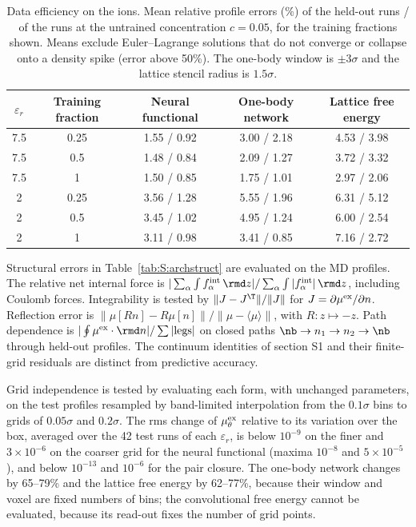\begin{table}[H]
\centering
\caption{Data efficiency on the ions. Mean relative profile errors (\%) of the held-out runs / of the runs at the untrained concentration $c=0.05$, for the training fractions shown. Means exclude Euler--Lagrange solutions that do not converge or collapse onto a density spike (error above 50\%). The one-body window is $\pm3\sigma$ and the lattice stencil radius is $1.5\sigma$.}
\label{tab:S:archfrac}
\begin{tabular}{c c c c c}
$\varepsilon_r$ & Training fraction & Neural functional & One-body network & Lattice free energy\\
\midrule
7.5 & 0.25 & 1.55 / 0.92 & 3.00 / 2.18 & 4.53 / 3.98\\
7.5 & 0.5 & 1.48 / 0.84 & 2.09 / 1.27 & 3.72 / 3.32\\
7.5 & 1 & 1.50 / 0.85 & 1.75 / 1.01 & 2.97 / 2.06\\
2 & 0.25 & 3.56 / 1.28 & 5.55 / 1.96 & 6.31 / 5.12\\
2 & 0.5 & 3.45 / 1.02 & 4.95 / 1.24 & 6.00 / 2.54\\
2 & 1 & 3.11 / 0.98 & 3.41 / 0.85 & 7.16 / 2.72\\
\bottomrule
\end{tabular}
\end{table}


Structural errors in Table~\ref{tab:S:archstruct} are evaluated on the MD profiles. The relative net internal force is $|\sum_\alpha\int f^{\rm int}_\alpha\,\rmd z|/\sum_\alpha\int|f^{\rm int}_\alpha|\,\rmd z$, including Coulomb forces. Integrability is tested by $\|J-J^{\T}\|/\|J\|$ for $J=\partial\mu^{\rm ex}/\partial n$. Reflection error is $\|\mu[Rn]-R\mu[n]\|/\|\mu-\langle\mu\rangle\|$, with $R:z\mapsto-z$. Path dependence is $|\oint\mu^{\rm ex}\cdot\rmd n|/\sum|{\rm legs}|$ on closed paths $\nb\to n_1\to n_2\to\nb$ through held-out profiles. The continuum identities of section S1 and their finite-grid residuals are distinct from predictive accuracy.

Grid independence is tested by evaluating each form, with unchanged parameters, on the test profiles resampled by band-limited interpolation from the $0.1\sigma$ bins to grids of $0.05\sigma$ and $0.2\sigma$. The rms change of $\mu^{\rm ex}_\theta$ relative to its variation over the box, averaged over the 42 test runs of each $\varepsilon_r$, is below $10^{-9}$ on the finer and $3\times10^{-6}$ on the coarser grid for the neural functional (maxima $10^{-8}$ and $5\times10^{-5}$), and below $10^{-13}$ and $10^{-6}$ for the pair closure. The one-body network changes by 65--79\% and the lattice free energy by 62--77\%, because their window and voxel are fixed numbers of bins; the convolutional free energy cannot be evaluated, because its read-out fixes the number of grid points.

